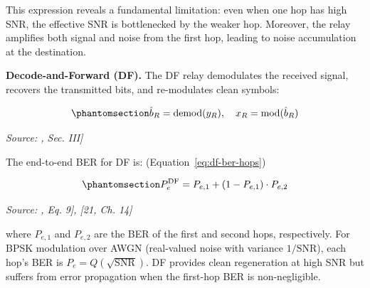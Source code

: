 This expression reveals a fundamental limitation: even when one hop has high SNR, the effective SNR is bottlenecked by the weaker hop. Moreover, the relay amplifies both signal and noise from the first hop, leading to noise accumulation at the destination.

\textbf{Decode-and-Forward (DF).} The DF relay demodulates the received signal, recovers the transmitted bits, and re-modulates clean symbols:

\begin{equation}\protect\phantomsection\label{eq:df-demod-remod}{\hat{b}_R = \text{demod}(y_R), \quad x_R = \text{mod}(\hat{b}_R)
}\end{equation} \par{\small\textit{Source: \cite{Laneman2004CooperativeDiversity}, Sec. III]}}

The end-to-end BER for DF is: (Equation~\ref{eq:df-ber-hops})

\begin{equation}\protect\phantomsection\label{eq:df-ber-hops}{P_e^{\text{DF}} = P_{e,1} + (1 - P_{e,1}) \cdot P_{e,2}
}\end{equation} \par{\small\textit{Source: \cite{Laneman2004CooperativeDiversity}, Eq. 9], [21, Ch. 14]}}

where \(P_{e,1}\) and \(P_{e,2}\) are the BER of the first and second hops, respectively. For BPSK modulation over AWGN (real-valued noise with variance \(1/\text{SNR}\)), each hop's BER is \(P_e = Q\left(\sqrt{\text{SNR}}\right)\). DF provides clean regeneration at high SNR but suffers from error propagation when the first-hop BER is non-negligible.

